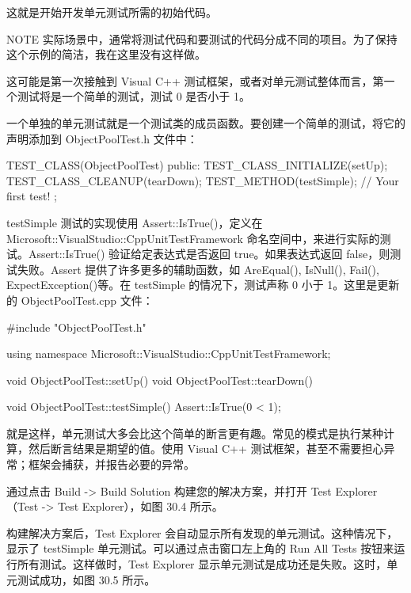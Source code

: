 这就是开始开发单元测试所需的初始代码。

\begin{myNotic}{NOTE}
实际场景中，通常将测试代码和要测试的代码分成不同的项目。为了保持这个示例的简洁，我在这里没有这样做。
\end{myNotic}


这可能是第一次接触到 Visual C++ 测试框架，或者对单元测试整体而言，第一个测试将是一个简单的测试，测试 0 是否小于 1。

一个单独的单元测试就是一个测试类的成员函数。要创建一个简单的测试，将它的声明添加到 ObjectPoolTest.h 文件中：

\begin{cpp}
TEST_CLASS(ObjectPoolTest)
{
    public:
        TEST_CLASS_INITIALIZE(setUp);
        TEST_CLASS_CLEANUP(tearDown);
        TEST_METHOD(testSimple); // Your first test!
};
\end{cpp}

testSimple 测试的实现使用 Assert::IsTrue()，定义在 Microsoft::VisualStudio::CppUnitTestFramework 命名空间中，来进行实际的测试。Assert::IsTrue() 验证给定表达式是否返回 true。如果表达式返回 false，则测试失败。Assert 提供了许多更多的辅助函数，如 AreEqual(), IsNull(), Fail(), ExpectException()等。在 testSimple 的情况下，测试声称 0 小于 1。这里是更新的 ObjectPoolTest.cpp 文件：

\begin{cpp}
#include "ObjectPoolTest.h"

using namespace Microsoft::VisualStudio::CppUnitTestFramework;

void ObjectPoolTest::setUp() { }
void ObjectPoolTest::tearDown() { }

void ObjectPoolTest::testSimple()
{
    Assert::IsTrue(0 < 1);
}
\end{cpp}

就是这样，单元测试大多会比这个简单的断言更有趣。常见的模式是执行某种计算，然后断言结果是期望的值。使用 Visual C++ 测试框架，甚至不需要担心异常；框架会捕获，并报告必要的异常。


通过点击 Build -> Build Solution 构建您的解决方案，并打开 Test Explorer（Test -> Test Explorer），如图 30.4 所示。


构建解决方案后，Test Explorer 会自动显示所有发现的单元测试。这种情况下，显示了 testSimple 单元测试。可以通过点击窗口左上角的 Run All Tests 按钮来运行所有测试。这样做时，Test Explorer 显示单元测试是成功还是失败。这时，单元测试成功，如图 30.5 所示。

